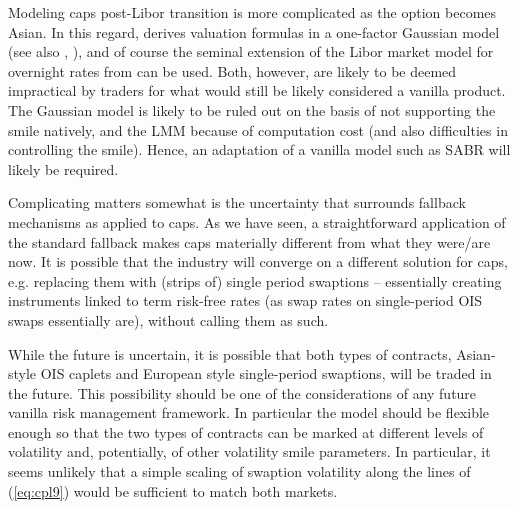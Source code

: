 \documentclass{article}
\begin{document}
Modeling caps post-Libor transition is more complicated as the option
becomes Asian. In this regard, \cite{henrard-ssrn1} derives valuation
formulas in a one-factor Gaussian model (see also \cite{henrard-cr1}, \cite%
{henrard-cr2}), and of course the seminal extension of the Libor market
model for overnight rates from \cite{lyas-merc-l} can be used. Both,
however, are likely to be deemed impractical by traders for what would still
be likely considered a vanilla product. The Gaussian model is likely to be
ruled out on the basis of not supporting the smile natively, and the LMM
because of computation cost (and also difficulties in controlling the
smile). Hence, an adaptation of a vanilla model such as SABR will likely be
required.

Complicating matters somewhat is the uncertainty that surrounds fallback
mechanisms as applied to caps. As we have seen, a straightforward
application of the standard fallback makes caps materially different from
what they were/are now. It is possible that the industry will converge on a
different solution for caps, e.g. replacing them with (strips of) single
period swaptions -- essentially creating instruments linked to term
risk-free rates (as swap rates on single-period OIS swaps essentially are),
without calling them as such.

While the future is uncertain, it is possible that both types of contracts,
Asian-style OIS caplets and European style single-period swaptions, will be
traded in the future. This possibility should be one of the considerations
of any future vanilla risk management framework. In particular the model
should be flexible enough so that the two types of contracts can be marked
at different levels of volatility and, potentially, of other volatility
smile parameters. In particular, it seems unlikely that a simple scaling of
swaption volatility along the lines of (\ref{eq:cpl9}) would be sufficient
to match both markets.
\end{document}
